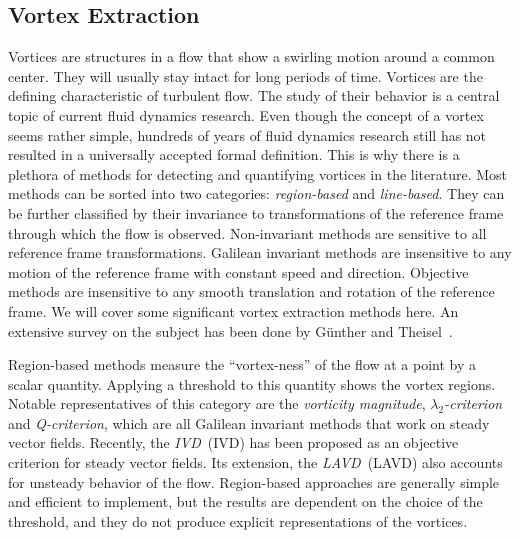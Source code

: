 \subsection{Vortex Extraction} %
\label{sub:vortex_extraction}
%
Vortices are structures in a flow that show a swirling motion around a common
center.
%
They will usually stay intact for long periods of time.
%
Vortices are the defining characteristic of turbulent flow.
%
The study of their behavior is a central topic of current fluid dynamics
research.
%
Even though the concept of a vortex seems rather simple, hundreds of years of
fluid dynamics research still has not resulted in a universally accepted formal
definition.
%
This is why there is a plethora of methods for detecting and quantifying
vortices in the literature.
%
Most methods can be sorted into two categories: \emph{region-based} and
\emph{line-based}.
%
They can be further classified by their invariance to transformations of the
reference frame through which the flow is observed.
%
Non-invariant methods are sensitive to all reference frame transformations.
%
Galilean invariant methods are insensitive to any motion of the reference frame
with constant speed and direction.
%
Objective methods are insensitive to any smooth translation and rotation of the
reference frame.
%
We will cover some significant vortex extraction methods here.
%
An extensive survey on the subject has been done by G\"unther and
Theisel~\cite{Guenther2018}.
%

%
Region-based methods measure the ``vortex-ness'' of the flow at a point by a
scalar quantity.
%
Applying a threshold to this quantity shows the vortex regions.
%
Notable representatives of this category are the \emph{vorticity magnitude},
\emph{$\lambda_2$-criterion} and \emph{Q-criterion}, which are all Galilean
invariant methods that work on steady vector fields.
%
Recently, the \emph{\acl{IVD}}~(\acs{IVD}) has been proposed as an objective
criterion for steady vector fields.
%
Its extension, the \emph{\acl{LAVD}}~(\acs{LAVD}) also accounts for unsteady
behavior of the flow.
%
Region-based approaches are generally simple and efficient to implement, but the
results are dependent on the choice of the threshold, and they do not produce
explicit representations of the vortices.
%

